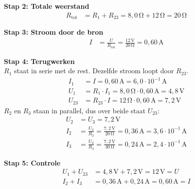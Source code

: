 \documentclass{ximera}
\begin{document}
\begin{example}[foldable=true,title={Voorbeeld: een weerstand in serie met twee parallelle weerstanden}]
\begin{solution}
        \textbf{Stap 2: Totale weerstand}
        \begin{align*}
            R_{\text{tot}} &= R_1 + R_{23} = 8{,}0\,\mathrm{\Omega} + 12\,\mathrm{\Omega} = 20\,\mathrm{\Omega}
        \end{align*}

        \textbf{Stap 3: Stroom door de bron}
        \begin{align*}
            I &= \frac{U}{R_{\text{tot}}} = \frac{12\,\mathrm{V}}{20\,\mathrm{\Omega}} = 0{,}60\,\mathrm{A}
        \end{align*}

        \textbf{Stap 4: Terugwerken}\\
        $R_1$ staat in serie met de rest. Dezelfde stroom loopt door $R_{23}$.
        \begin{align*}
            I_1 &= I = 0{,}60\,\mathrm{A} = \boxed{6{,}0 \cdot 10^{-1}\,\mathrm{A}} \\
            U_1 &= R_1 \cdot I_1 = 8{,}0\,\mathrm{\Omega} \cdot 0{,}60\,\mathrm{A} = \boxed{4{,}8\,\mathrm{V}} \\
            U_{23} &= R_{23} \cdot I = 12\,\mathrm{\Omega} \cdot 0{,}60\,\mathrm{A} = 7{,}2\,\mathrm{V}
        \end{align*}
        $R_2$ en $R_3$ staan in parallel, dus over beide staat $U_{23}$:
        \begin{align*}
            U_2 &= U_3 = \boxed{7{,}2\,\mathrm{V}} \\
            I_2 &= \frac{U_2}{R_2} = \frac{7{,}2\,\mathrm{V}}{20\,\mathrm{\Omega}} = 0{,}36\,\mathrm{A} = \boxed{3{,}6 \cdot 10^{-1}\,\mathrm{A}} \\
            I_3 &= \frac{U_3}{R_3} = \frac{7{,}2\,\mathrm{V}}{30\,\mathrm{\Omega}} = 0{,}24\,\mathrm{A} = \boxed{2{,}4 \cdot 10^{-1}\,\mathrm{A}}
        \end{align*}

        \textbf{Stap 5: Controle}
        \begin{align*}
            U_1 + U_{23} &= 4{,}8\,\mathrm{V} + 7{,}2\,\mathrm{V} = 12\,\mathrm{V} = U \\
            I_2 + I_3 &= 0{,}36\,\mathrm{A} + 0{,}24\,\mathrm{A} = 0{,}60\,\mathrm{A} = I
        \end{align*}
    \end{solution}
\end{example}
\end{document}
